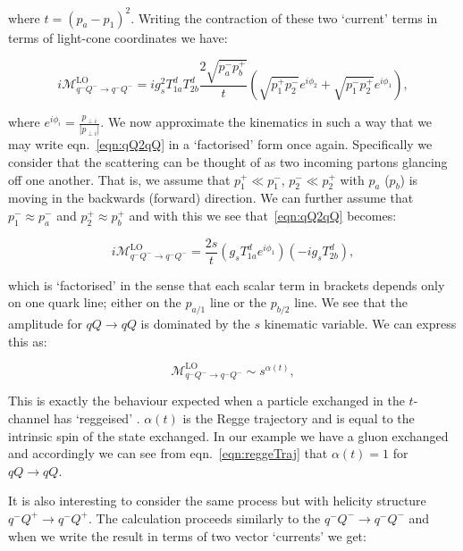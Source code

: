 	where $t = (p_a - p_1)^2$.  Writing the contraction of these two `current'
	terms in terms of light-cone coordinates we have:

	\begin{equation}
		i\mathcal{M}_{q^-Q^-\rightarrow q^-Q^-}^{\text{LO}} = ig_s^2T^d_{1a}T^d_{2b}
		\frac{2\sqrt{p_a^-p_b^+}}{t}
		\left(\sqrt{p_1^+p_2^-}e^{i\phi_2} + \sqrt{p_1^-p_2^+}e^{i\phi_1}\right),
		\label{eqn:qQ2qQ}
	\end{equation}

	where $e^{i\phi_i} = \frac{p_{\perp i}}{|p_{\perp i}|}$.  We now approximate the kinematics
	in such a way that we may write eqn.~\eqref{eqn:qQ2qQ} in a `factorised' form once again.
	Specifically we consider that the scattering can be thought of as two incoming partons glancing off
	one another.  That is, we assume that $p_1^+\ll p_1^-$, $p_2^-\ll p_2^+$ with $p_a$ ($p_b$)
	is moving in the backwards (forward) direction.  We can further assume that $p_1^-\approx p_a^-$
	and $p_2^+\approx p_b^+$ and with this we see that~\eqref{eqn:qQ2qQ} becomes:

	\begin{equation}
		i\mathcal{M}_{q^-Q^-\rightarrow q^-Q^-}^{\text{LO}} =
		\frac{2s}{t}\left(g_sT^d_{1a}e^{i\phi_1}\right)\left(-ig_sT^d_{2b}\right),
		\label{eqn:reggeTraj}
	\end{equation}

	which is `factorised' in the sense that each scalar term in brackets depends only on one
	quark line; either on the $p_{a/1}$ line or the $p_{b/2}$ line.  We see that the amplitude
	for $qQ\rightarrow qQ$ is dominated by the $s$ kinematic variable.  We can express this as:

	\begin{equation}
		\mathcal{M}_{q^-Q^-\rightarrow q^-Q^-}^{\text{LO}} \sim s^{\alpha(t)},
	\end{equation}

	This is exactly the behaviour expected when a particle exchanged in the $t$-channel has `reggeised'
	\cite{sabioThesis,DelDuca:1995hf,lipatovBook}.  $\alpha(t)$ is the Regge trajectory and is equal to
	the intrinsic spin of the state exchanged.  In our example we have a gluon exchanged
	and accordingly we can see from eqn.~\eqref{eqn:reggeTraj} that $\alpha(t)=1$ for $qQ\rightarrow qQ$.

	It is also interesting to consider the same process but with helicity structure $q^-Q^+\to q^-Q^+$.
	The calculation proceeds similarly to the $q^-Q^-\to q^-Q^-$ and when we write the result in
	terms of two vector `currents' we get:

